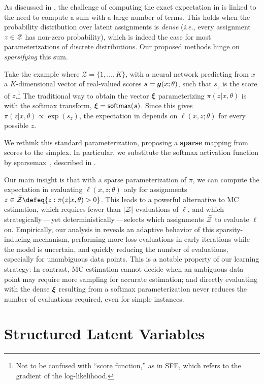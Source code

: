 \noindent As discussed in , the challenge of computing the
exact expectation in  is linked to the need to compute
a sum with a large number of terms. This holds when the probability
distribution over latent assignments is {\it dense} ({\it i.e.},
every assignment $z \in \mathcal{Z}$ has non-zero probability), which is
indeed the case for most parameterizations of discrete distributions.
Our proposed methods hinge on {\it sparsifying} this sum.

Take the example where $\mathcal Z = \{1, \ldots, K\}$, with a neural
network predicting from $x$ a $K$-dimensional vector of real-valued
scores $\bm{s} = \bm{g}(x; \theta)$, such that $s_z$ is the score of
$z$.\footnote{Not to be confused with ``score function,'' as in SFE,
    which refers to the gradient of the log-likelihood.} The traditional
way to obtain the vector $\bm{\xi}$ parameterizing $\pi(z|x,\theta)$ is
with the softmax transform, \ie $\bm{\xi} = \operatorname*{\mathsf{softmax}}(\bm{s})$. Since this
gives $\pi(z|x,\theta) \propto \exp(s_z)$, the expectation in
 depends on $\ell(x, z; \theta)$ for every possible
$z$.

We rethink this standard parameterization, proposing a
\textbf{sparse} mapping from scores to the simplex. In particular, we
substitute the softmax activation function by
sparsemax~\citep{sparsemax}, described in
.

Our main insight is that with a sparse parameterization of $\pi$, we
can compute the expectation in  evaluating $\ell(x, z;
    \theta)$ only for assignments $z \in \bar\ZZ \defeq \{z : \pi(z | x,
    \theta) > 0\}$. This leads to a powerful alternative to MC
estimation, which requires fewer than $|\mathcal{Z}|$ evaluations of $\ell$,
and which strategically\,---\,yet deterministically\,---\,selects
which assignments $\bar{\mathcal{Z}}$ to evaluate $\ell$ on. Empirically, our
analysis in  reveals an adaptive behavior of
this sparsity-inducing mechanism, performing more loss evaluations in
early iterations while the model is uncertain, and quickly reducing
the number of evaluations, especially for unambiguous data points.
This is a notable property of our learning strategy: In contrast, MC
estimation cannot decide when an ambiguous data point may require
more sampling for accurate estimation; and directly evaluating
 with the dense $\bm{\xi}$ resulting from a softmax
parameterization never reduces the number of evaluations required,
even for simple instances.

\section{\label{sec:structured}Structured Latent Variables}

